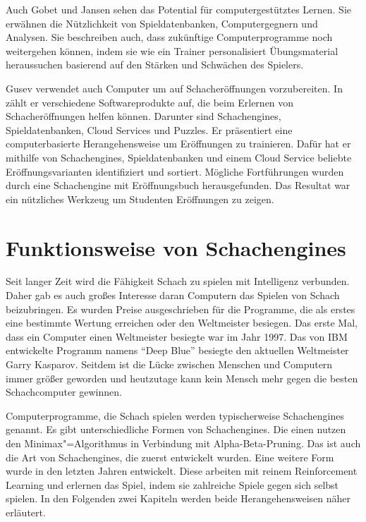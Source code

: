 Auch Gobet und Jansen sehen das Potential für computergestütztes Lernen. Sie erwähnen die Nützlichkeit von Spieldatenbanken, Computergegnern und Analysen. Sie beschreiben auch, dass zukünftige Computerprogramme noch weitergehen können, indem sie wie ein Trainer personalisiert Übungsmaterial heraussuchen basierend auf den Stärken und Schwächen des Spielers.
\cite{gobet_training_2006} 

Gusev verwendet auch Computer um auf Schacheröffnungen vorzubereiten. In \cite{gusev_using_2021} zählt er verschiedene Softwareprodukte auf, die beim Erlernen von Schacheröffnungen helfen können. Darunter sind Schachengines, Spieldatenbanken, Cloud Services und Puzzles. Er präsentiert eine computerbasierte Herangehensweise um Eröffnungen zu trainieren. Dafür hat er mithilfe von Schachengines, Spieldatenbanken und einem Cloud Service beliebte Eröffnungsvarianten identifiziert und sortiert. Mögliche Fortführungen wurden durch eine Schachengine mit Eröffnungsbuch herausgefunden. Das Resultat war ein nützliches Werkzeug um Studenten Eröffnungen zu zeigen.

\section{Funktionsweise von Schachengines}
Seit langer Zeit wird die Fähigkeit Schach zu spielen mit Intelligenz verbunden.
Daher gab es auch großes Interesse daran Computern das Spielen von Schach beizubringen.
Es wurden Preise ausgeschrieben für die Programme, die als erstes eine bestimmte Wertung erreichen oder den Weltmeister besiegen. Das erste Mal, dass ein Computer einen Weltmeister besiegte war im Jahr 1997. Das von IBM entwickelte Programm namens \enquote{Deep Blue} besiegte den aktuellen Weltmeister Garry Kasparov. Seitdem ist die Lücke zwischen Menschen und Computern immer größer geworden und heutzutage kann kein Mensch mehr gegen die besten Schachcomputer gewinnen.
\cite{vjekoslav_nemec_history_2019}

Computerprogramme, die Schach spielen werden typischerweise Schachengines genannt. Es gibt unterschiedliche Formen von Schachengines. Die einen nutzen den Minimax"=Algorithmus in Verbindung mit Alpha-Beta-Pruning. Das ist auch die Art von Schachengines, die zuerst entwickelt wurden. Eine weitere Form wurde in den letzten Jahren entwickelt. Diese arbeiten mit reinem Reinforcement Learning und erlernen das Spiel, indem sie zahlreiche Spiele gegen sich selbst spielen. In den Folgenden zwei Kapiteln werden beide Herangehensweisen näher erläutert.

